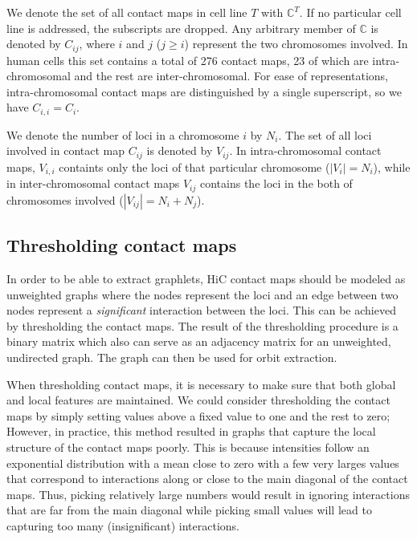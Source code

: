 \documentclass[a4,center,fleqn]{NAR}
\begin{document}
We denote the set of all contact maps in cell line $T$ with 
$\mathbb{C}^T$. If no particular cell line is addressed, the
subscripts are dropped.
Any arbitrary member of $\mathbb{C}$ is denoted by 
$C_{ij}$, where $i$ and $j$ ($j \ge i$) represent the two chromosomes involved. 
In human cells this set contains a total of 276 contact maps,
23 of which are intra-chromosomal and the rest are inter-chromosomal.
For ease of representations, intra-chromosomal contact maps are
distinguished by a single superscript, so we have $C_{i,i} =
C_i$.

We denote the number of loci in a chromosome $i$ by $N_i$.
The set of all loci involved in contact map $C_{ij}$ is denoted 
by $V_{ij}$.
In intra-chromosomal contact maps, $V_{i,i}$ containts only the 
loci of that particular chromosome ($|V_i| = N_i$), while in 
inter-chromosomal contact maps $V_{ij}$ contains the loci in
the both of chromosomes involved ($|V_{ij}| = N_i + N_j$).

\enlargethispage{-65.1pt}

\subsection{Thresholding contact maps}
In order to be able to extract graphlets, HiC contact maps should be modeled as
unweighted graphs where the nodes represent the loci and an edge between two 
nodes represent a \textit{significant} interaction between the loci.
This can be achieved by thresholding the contact maps. The result
of the thresholding procedure is a binary matrix which also can serve as
an adjacency matrix for an unweighted, undirected graph. The graph can then be
used for orbit extraction.

When thresholding contact maps, it is necessary to make sure
that both global and local features are maintained. We could consider 
thresholding the contact maps by simply setting values above a fixed value to
one and the rest to zero; However, in practice, this method resulted in graphs
that capture the local structure of the contact maps poorly. This is because
intensities follow an exponential distribution with a mean close to zero
with a few very larges values that correspond to interactions along 
or close to the main diagonal of the contact maps.
Thus, picking relatively large numbers would result in ignoring interactions
that are far from the main diagonal while picking small values will lead to
capturing too many (insignificant) interactions.
\end{document}
